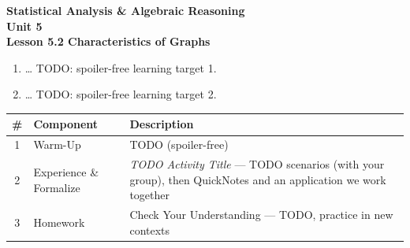 \documentclass[10pt]{article}
\begin{document}
\vspace{-0.8in}

\begin{center}
  {\color{white}\textbf{\LARGE Statistical Analysis \& Algebraic Reasoning}}\\[4pt]
  {\color{frostmid}\large\textbf{Unit 5}}\\[6pt]
  {\color{white}\textbf{\large Lesson 5.2 \quad Characteristics of Graphs}}
\end{center}

\vspace{0.22in}
\namedateperiod
\vspace{0.18in}

\begin{learningtargetbox}
\small
\begin{enumerate}[leftmargin=1.5em, itemsep=5pt]
  \item \ldots{} TODO: spoiler-free learning target 1.
  \item \ldots{} TODO: spoiler-free learning target 2.
\end{enumerate}
\end{learningtargetbox}

\vspace{0.14in}

\begin{tocbox}
\small
\renewcommand{\arraystretch}{1.5}
\begin{tabularx}{\linewidth}{@{} c l X @{}}
\rowcolor{frost}
\textbf{\#} & \textbf{Component} & \textbf{Description} \\
\midrule
1 & Warm-Up    & TODO (spoiler-free) \\
2 & Experience \& Formalize & \emph{TODO Activity Title} --- TODO scenarios (with your group),
                 then QuickNotes and an application we work together \\
3 & Homework   & Check Your Understanding --- TODO, practice in new contexts \\
\end{tabularx}
\end{tocbox}
\end{document}
